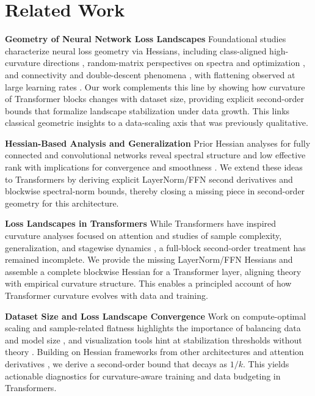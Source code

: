 \documentclass{article}
\begin{document}
\section{Related Work}\label{sec:rw}

\textbf{Geometry of Neural Network Loss Landscapes} Foundational studies characterize neural loss geometry via Hessians, including class-aligned high-curvature directions \cite{fort2019emergentpropertieslocalgeometry}, random-matrix perspectives on spectra and optimization \cite{pmlr-v70-pennington17a}, and connectivity and double-descent phenomena \cite{garipov2018losssurfacesmodeconnectivity, singh2022phenomenologydoubledescentfinitewidth, draxler2019essentiallynobarriers, nguyen2017losssurfacedeepwide}, with flattening observed at large learning rates \cite{wang2023instabilitieslargelearningrate}. Our work complements this line by showing how curvature of Transformer blocks changes with dataset size, providing explicit second-order bounds that formalize landscape stabilization under data growth. This links classical geometric insights to a data-scaling axis that was previously qualitative.

\textbf{Hessian-Based Analysis and Generalization} Prior Hessian analyses for fully connected and convolutional networks reveal spectral structure and low effective rank with implications for convergence and smoothness \cite{kiselev2024unraveling, meshkov2024convnets}. We extend these ideas to Transformers by deriving explicit LayerNorm/FFN second derivatives and blockwise spectral-norm bounds, thereby closing a missing piece in second-order geometry for this architecture.

\textbf{Loss Landscapes in Transformers} While Transformers \cite{vaswani2017attention} have inspired curvature analyses focused on attention \cite{ormaniec2024attentionhessian} and studies of sample complexity, generalization, and stagewise dynamics \cite{li2023theoreticalunderstandingshallowvision, zhang2025understandinggeneralizationincontextlearning, anonymous2024stagewisedevelopmenttransformers}, a full-block second-order treatment has remained incomplete. We provide the missing LayerNorm/FFN Hessians and assemble a complete blockwise Hessian for a Transformer layer, aligning theory with empirical curvature structure. This enables a principled account of how Transformer curvature evolves with data and training.

\textbf{Dataset Size and Loss Landscape Convergence} Work on compute-optimal scaling and sample-related flatness highlights the importance of balancing data and model size \cite{hoffmann2022training, wu2017towards}, and visualization tools hint at stabilization thresholds without theory \cite{xie2024losslens}. Building on Hessian frameworks from other architectures \cite{kiselev2024unraveling, meshkov2024convnets} and attention derivatives \cite{ormaniec2024attentionhessian}, we derive a second-order bound that decays as $1/k$. This yields actionable diagnostics for curvature-aware training and data budgeting in Transformers.
\end{document}
